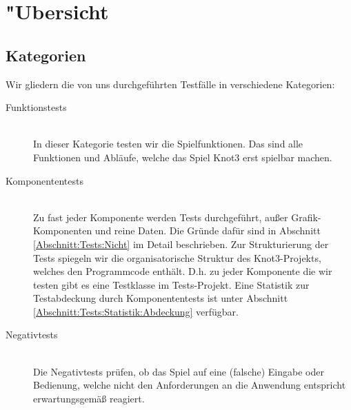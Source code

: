 %



\section{{"U}bersicht}
\label{Abschnitt:Tests:Uebersicht}



\subsection{Kategorien}
\label{Abschnitt:Tests:Uebersicht:Kategorien}

Wir gliedern die von uns durchgeführten Testfälle in verschiedene Kategorien:\\


\begin{description} %


	\item[Funktionstests] \hfill
	\\
	
	In dieser Kategorie testen wir die Spielfunktionen. Das sind alle Funktionen und Abläufe, welche das Spiel Knot3 erst spielbar machen.
	  
	
	\item[Komponententests] \hfill
	\\
	
	Zu fast jeder Komponente werden Tests durchgeführt, außer Grafik-Komponenten und reine Daten. Die Gründe dafür sind in Abschnitt \ref{Abschnitt:Tests:Nicht} im Detail beschrieben. Zur Strukturierung der Tests spiegeln wir die organisatorische Struktur des Knot3-Projekts, welches den Programmcode enthält. D.h. zu jeder Komponente die wir testen gibt es eine Testklasse im Tests-Projekt. Eine Statistik zur Testabdeckung durch Komponententests ist unter Abschnitt \ref{Abschnitt:Tests:Statistik:Abdeckung} verfügbar.\\


	\item[Negativtests] \hfill
	\\
	
	Die Negativtests prüfen, ob das Spiel auf eine (falsche) Eingabe oder Bedienung, welche nicht den Anforderungen an die Anwendung entspricht erwartungsgemäß reagiert. 
	

\end{description}
